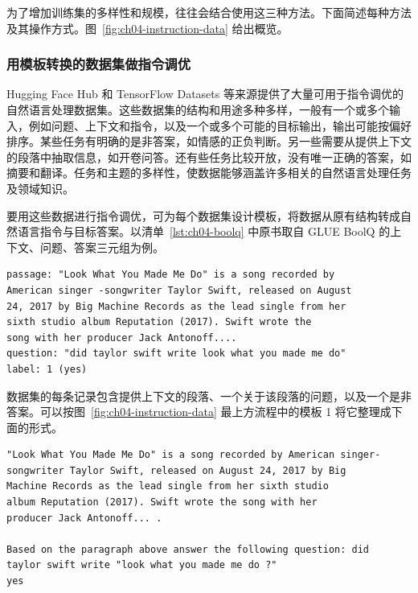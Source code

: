 为了增加训练集的多样性和规模，往往会结合使用这三种方法。下面简述每种方法及其操作方式。图~\ref{fig:ch04-instruction-data} 给出概览。

\subsubsection{用模板转换的数据集做指令调优}
Hugging Face Hub 和 TensorFlow Datasets 等来源提供了大量可用于指令调优的自然语言处理数据集。这些数据集的结构和用途多种多样，一般有一个或多个输入，例如问题、上下文和指令，以及一个或多个可能的目标输出，输出可能按偏好排序。某些任务有明确的是非答案，如情感的正负判断。另一些需要从提供上下文的段落中抽取信息，如开卷问答。还有些任务比较开放，没有唯一正确的答案，如摘要和翻译。任务和主题的多样性，使数据能够涵盖许多相关的自然语言处理任务及领域知识。


要用这些数据进行指令调优，可为每个数据集设计模板，将数据从原有结构转成自然语言指令与目标答案。以清单~\ref{lst:ch04-boolq} 中原书取自 GLUE BoolQ 的上下文、问题、答案三元组为例。

\noindent\begin{minipage}{\linewidth}
\begin{lstlisting}[caption={原书的 GLUE BoolQ 样例},label={lst:ch04-boolq}]
passage: "Look What You Made Me Do" is a song recorded by
American singer -songwriter Taylor Swift, released on August
24, 2017 by Big Machine Records as the lead single from her
sixth studio album Reputation (2017). Swift wrote the
song with her producer Jack Antonoff....
question: "did taylor swift write look what you made me do"
label: 1 (yes)
\end{lstlisting}
\end{minipage}\par

数据集的每条记录包含提供上下文的段落、一个关于该段落的问题，以及一个是非答案。可以按图~\ref{fig:ch04-instruction-data} 最上方流程中的模板 1 将它整理成下面的形式。

\noindent\begin{minipage}{\linewidth}
\begin{lstlisting}[caption={问答样例},label={lst:ch04-qa}]
"Look What You Made Me Do" is a song recorded by American singer-
songwriter Taylor Swift, released on August 24, 2017 by Big
Machine Records as the lead single from her sixth studio
album Reputation (2017). Swift wrote the song with her
producer Jack Antonoff... .

Based on the paragraph above answer the following question: did
taylor swift write "look what you made me do ?"
yes
\end{lstlisting}
\end{minipage}\par

